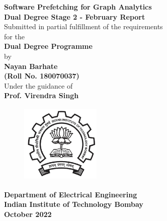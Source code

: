 \documentclass[a4paper,12pt, final]{report}
\begin{document}
  \thispagestyle{empty}
  \vspace*{1cm}
  {\centering     
  \textbf{\LARGE Software Prefetching for Graph Analytics}\\
  \vspace{1.20cm}
  \textbf{\large Dual Degree Stage 2 - February Report}\\
  \vspace{1cm}
  {Submitted in partial fulfillment of the requirements}\\
  \vspace{0.25cm}
  {for the }\\
  \vspace{1cm}
  \textbf{ Dual Degree Programme}\\
  \vspace{1.50cm}
  {by}\\
  \vspace{0.20cm}
  \textbf{\large Nayan Barhate}\\
  \vspace{0.25cm}
  \textbf{\large (Roll No. 180070037)}\\
  \vspace{1.8cm}
  {Under the guidance of}\\
  \vspace{0.20cm}
  \textbf{\large Prof. Virendra Singh}\\
    \vspace{0.30cm}
  \vspace{1.450cm}
    \begin{figure}[htb]
    \begin{center}
    \includegraphics[height=1.5in,width=1.5in]{iitblogo.png}
    \end{center}
    \end{figure}

    
  {\textbf{Department of Electrical Engineering}}\\
  {\textbf{Indian Institute of Technology Bombay}}\\
  {\textbf{October 2022}}
 
 }
 
\end{document}
